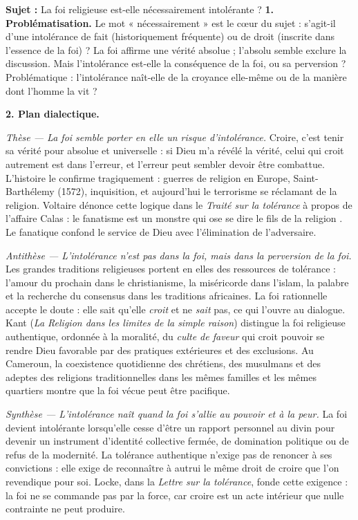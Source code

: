 \documentclass[11pt]{article}
\newcommand{\cle}[1]{{\popxbold\color{popdark}#1}}
\begin{document}
\begin{exoresolu}
\textbf{Sujet :} La foi religieuse est-elle nécessairement intolérante ?
\tcblower
\textbf{1. Problématisation.} Le mot « nécessairement » est le cœur du sujet : s'agit-il d'une intolérance de fait (historiquement fréquente) ou de droit (inscrite dans l'essence de la foi) ? La foi affirme une vérité absolue ; l'absolu semble exclure la discussion. Mais l'intolérance est-elle la conséquence de la foi, ou sa perversion ? Problématique : l'intolérance naît-elle de la croyance elle-même ou de la manière dont l'homme la vit ?

\textbf{2. Plan dialectique.}

\emph{Thèse — La foi semble porter en elle un risque d'intolérance.} Croire, c'est tenir sa vérité pour absolue et universelle : si Dieu m'a révélé la vérité, celui qui croit autrement est dans l'erreur, et l'erreur peut sembler devoir être combattue. L'histoire le confirme tragiquement : guerres de religion en Europe, Saint-Barthélemy (1572), inquisition, et aujourd'hui le terrorisme se réclamant de la religion. Voltaire dénonce cette logique dans le \emph{Traité sur la tolérance} à propos de l'affaire Calas : le fanatisme est \guillemotleft un monstre qui ose se dire le fils de la religion \guillemotright. Le fanatique confond le service de Dieu avec l'élimination de l'adversaire.

\emph{Antithèse — L'intolérance n'est pas dans la foi, mais dans la perversion de la foi.} Les grandes traditions religieuses portent en elles des ressources de tolérance : l'amour du prochain dans le christianisme, la miséricorde dans l'islam, la palabre et la recherche du consensus dans les traditions africaines. La \cle{foi rationnelle} accepte le doute : elle sait qu'elle \emph{croit} et ne \emph{sait} pas, ce qui l'ouvre au dialogue. Kant (\emph{La Religion dans les limites de la simple raison}) distingue la foi religieuse authentique, ordonnée à la moralité, du \emph{culte de faveur} qui croit pouvoir se rendre Dieu favorable par des pratiques extérieures et des exclusions. Au Cameroun, la coexistence quotidienne des chrétiens, des musulmans et des adeptes des religions traditionnelles dans les mêmes familles et les mêmes quartiers montre que la foi vécue peut être pacifique.

\emph{Synthèse — L'intolérance naît quand la foi s'allie au pouvoir et à la peur.} La foi devient intolérante lorsqu'elle cesse d'être un rapport personnel au divin pour devenir un instrument d'identité collective fermée, de domination politique ou de refus de la modernité. La tolérance authentique n'exige pas de renoncer à ses convictions : elle exige de reconnaître à autrui le même droit de croire que l'on revendique pour soi. Locke, dans la \emph{Lettre sur la tolérance}, fonde cette exigence : la foi ne se commande pas par la force, car croire est un acte intérieur que nulle contrainte ne peut produire.


\end{exoresolu}
\end{document}
